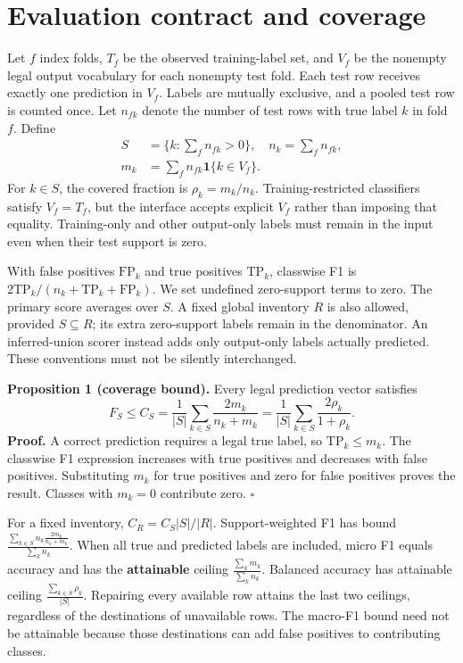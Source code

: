 \documentclass[twocolumn]{svjour3}
\begin{document}
\section{Evaluation contract and coverage}
Let $f$ index folds, $T_f$ be the observed training-label set, and $V_f$ be the nonempty legal output vocabulary for each nonempty test fold. Each test row receives exactly one prediction in $V_f$. Labels are mutually exclusive, and a pooled test row is counted once. Let $n_{f k}$ denote the number of test rows with true label $k$ in fold $f$. Define
\begin{equation}\begin{aligned}S&=\{k:\sum_f n_{fk}>0\},\quad n_k=\sum_f n_{fk},\\m_k&=\sum_f n_{fk}\mathbf1\{k\in V_f\}.\end{aligned}\end{equation}
For $k \in S$, the covered fraction is $\rho_k=m_k/n_k$. Training-restricted classifiers satisfy $V_f=T_f$, but the interface accepts explicit $V_f$ rather than imposing that equality. Training-only and other output-only labels must remain in the input even when their test support is zero.

With false positives $\mathrm{FP}_k$ and true positives $\mathrm{TP}_k$, classwise F1 is $2\mathrm{TP}_k/(n_k+\mathrm{TP}_k+\mathrm{FP}_k)$. We set undefined zero-support terms to zero. The primary score averages over $S$. A fixed global inventory $R$ is also allowed, provided $S \subseteq R$; its extra zero-support labels remain in the denominator. An inferred-union scorer instead adds only output-only labels actually predicted. These conventions must not be silently interchanged.

\textbf{Proposition 1 (coverage bound).} Every legal prediction vector satisfies
\begin{equation}F_S\le C_S=\frac1{|S|}\sum_{k\in S}\frac{2m_k}{n_k+m_k}=\frac1{|S|}\sum_{k\in S}\frac{2\rho_k}{1+\rho_k}.\end{equation}
\textbf{Proof.} A correct prediction requires a legal true label, so $\mathrm{TP}_k\le m_k$. The classwise F1 expression increases with true positives and decreases with false positives. Substituting $m_k$ for true positives and zero for false positives proves the result. Classes with $m_k=0$ contribute zero. $\square$

For a fixed inventory, $C_R=C_S |S|/|R|$. Support-weighted F1 has bound $\frac{\sum_{k\in S}n_k\frac{2m_k}{n_k+m_k}}{\sum_k n_k}$. When all true and predicted labels are included, micro F1 equals accuracy and has the \textbf{attainable} ceiling $\frac{\sum_k m_k}{\sum_k n_k}$. Balanced accuracy has attainable ceiling $\frac{\sum_{k\in S}\rho_k}{|S|}$. Repairing every available row attains the last two ceilings, regardless of the destinations of unavailable rows. The macro-F1 bound need not be attainable because those destinations can add false positives to contributing classes.
\end{document}
